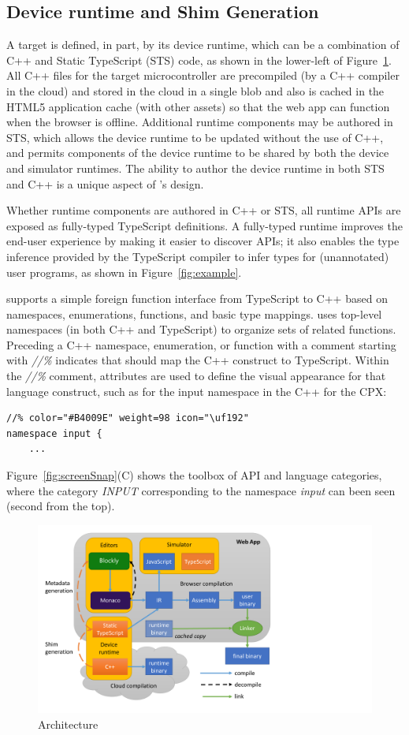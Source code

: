 \subsection{Device runtime and Shim Generation}

A \MC target is defined, in part, by its device runtime, which can be a combination of C++ 
and Static TypeScript (STS) code, as shown in the lower-left of Figure~\ref{fig:makecode}.
All C++ files for the target microcontroller are precompiled (by a C++ compiler in the cloud)
and stored in the cloud in a single blob and also is cached in the HTML5 application cache (with 
other assets) so that the web app can function when the browser is offline. Additional runtime
components may be authored in STS, which allows the device runtime to be updated without the
use of C++, and permits components of the device runtime to be shared by both the device
and simulator runtimes. The ability to author the device runtime in both STS and C++ is
a unique aspect of \MCN's design.

Whether runtime components are authored in C++ or STS, all runtime APIs are exposed as fully-typed
TypeScript definitions. A fully-typed runtime improves the end-user experience 
by making it easier to discover APIs; it also enables the type inference provided by the TypeScript 
compiler to infer types for (unannotated) user programs, as shown in Figure~\ref{fig:example}.

\MC supports a simple foreign function interface from TypeScript to C++ based on namespaces,
enumerations, functions, and basic type mappings. \MC uses top-level namespaces (in both C++ and
TypeScript) to organize sets of related functions.  Preceding a C++ namespace, enumeration, or function
with a comment starting with \emph{//\%} indicates that \MC should map the C++ construct to TypeScript.
Within the \emph{//\%} comment, attributes are used to define the visual appearance for that
language construct, such as for the input namespace in the C++ for the CPX:
\begin{lstlisting}
//% color="#B4009E" weight=98 icon="\uf192"
namespace input {
    ...
\end{lstlisting}

Figure~\ref{fig:screenSnap}(C) shows the toolbox of API and language categories, where the 
category \emph{INPUT} corresponding to the namespace \emph{input} can been seen (second
from the top).

\begin{figure}[t]
    \includegraphics[width=4.5in]{makecodeFig.pdf}
\caption{\label{fig:makecode}\MC Architecture}
\end{figure}

